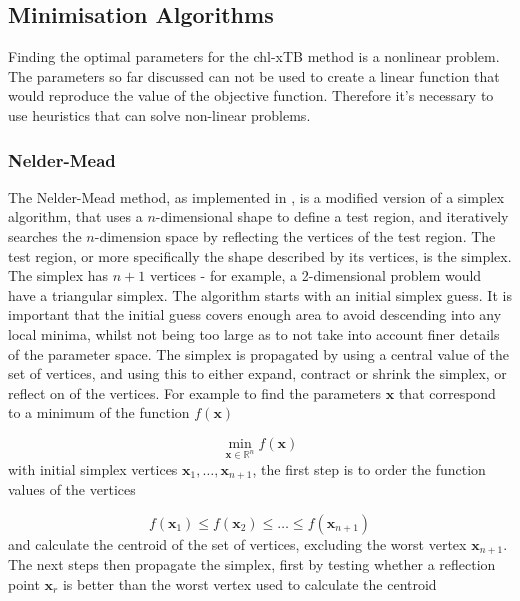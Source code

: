 \subsection{Minimisation Algorithms}
\label{subsec:algorithms}
Finding the optimal parameters for the chl-xTB method is a nonlinear problem. The
parameters so far discussed can not be used to create a linear function that would
reproduce the value of the objective function. Therefore it's necessary to use heuristics
that can solve non-linear problems.

\subsubsection{Nelder-Mead}
\label{nelder_mead}
The Nelder-Mead method, as implemented in , is a modified version of a simplex
algorithm, that uses a $n$-dimensional shape to define a test region, and iteratively
searches the $n$-dimension space by reflecting the vertices of the test region. 
The test region, or more specifically the shape described by its vertices, is the
simplex. The simplex has $n+1$ vertices - for example, a 2-dimensional problem
would have a triangular simplex.
The algorithm starts with an initial simplex guess. It is important that the initial
guess covers enough area to avoid descending into any local minima, whilst not being
too large as to not take into account finer details of the parameter space.
The simplex is propagated by using a central value of the set of vertices, and using
this to either expand, contract or shrink the simplex, or reflect on of the vertices.
For example to find the parameters $\mathbf{x}$ that correspond to a minimum of
the function $f\left(\mathbf{x}\right)$

\begin{equation}
\min_{\mathbf{x} \in \mathbb{R}^n} f\left( \mathbf{x} \right)
\end{equation}
%
with initial simplex vertices $\mathbf{x}_1, \dots, \mathbf{x}_{n+1}$, the first 
step is to order the function values of the vertices

\begin{equation}
f\left(\mathbf{x}_1\right) \leq f\left(\mathbf{x}_2\right) \leq \dots \leq f\left(\mathbf{x}_{n+1}\right)
\end{equation}
%
and calculate the centroid of the set of vertices, excluding the worst vertex 
$\mathbf{x}_{n+1}$. The next steps then propagate the simplex, first by testing 
whether a reflection point $\mathbf{x}_r$ is better than the worst vertex used to
calculate the centroid

